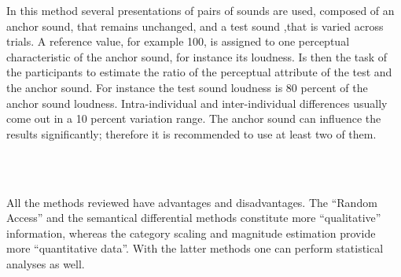 In this method several presentations of pairs of sounds are used, composed of an
anchor sound, that remains unchanged, and a test sound ,that is varied across
trials. A reference value, for example 100, is assigned to one perceptual
characteristic of the anchor sound, for instance its loudness. Is then the task
of the participants to estimate the ratio of the perceptual attribute of the
test and the anchor sound. For instance the test sound loudness is 80 percent of
the anchor sound loudness. Intra-individual and inter-individual differences
usually come out in a 10 percent variation range. The anchor sound can influence
the results significantly; therefore it is recommended to use at least two of
them.

\\\

All the methods reviewed have advantages and disadvantages. The ``Random
Access'' and the semantical differential methods constitute more ``qualitative''
information, whereas the category scaling and magnitude estimation provide more
``quantitative data''. With the latter methods one can perform statistical 
analyses as well.
